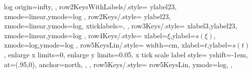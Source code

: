 {{{                log origin=infty,
              },
              row2KeysWithLabels/.style={
                ylabel23,
                xmode=linear,ymode=log
              },
              row2Keys/.style={
                ylabel23,
                xmode=linear,ymode=log,
                xticklabels={},
              },
              row3Keys/.style={
                xlabel3,ylabel23,
                xmode=linear,ymode=log
              },
              row4Keys/.style={
                xlabel={\(\xi\)},ylabel={\(s(\xi)\)},
                xmode=log,ymode=log
              },
              row5KeysLin/.style={
                width=\plotLastWidth cm,
                xlabel={\(t\)},ylabel={\(s(t)\)},
                enlarge x limits=0,
                enlarge y limits=0.05,
                x tick scale label style={
                  yshift=-1em,
                  at={(.95,0)},
                  anchor=north,
                },
              },
              row5Keys/.style={
                row5KeysLin,
                ymode=log,
              },
            }
        }
    
